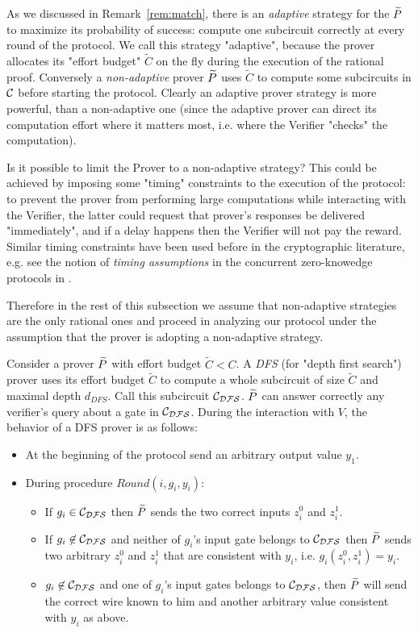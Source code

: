 As we discussed in Remark~\ref{rem:match}, there is an {\em adaptive} strategy for the $\widetilde{P}$ to maximize its probability of success: compute one subcircuit correctly at every round of the protocol. We call this strategy "adaptive", because the prover allocates its "effort budget" $\tilde{C}$ on the fly during the execution of the rational proof. Conversely a {\em non-adaptive} prover $\widetilde{P}$ uses $\tilde{C}$ to compute some subcircuits in $\cal C$ before starting the protocol. Clearly an adaptive prover strategy is more powerful, than a non-adaptive one (since the adaptive prover can direct its computation effort where it matters most, i.e. where the Verifier "checks" the computation). 

Is it possible to limit the Prover to a non-adaptive strategy? This could be achieved by imposing some "timing" constraints to the execution of the protocol: to prevent the prover from performing large computations while interacting with the Verifier, the latter could request that prover's responses be delivered "immediately", and if a delay happens then the Verifier will not pay the reward. Similar timing constraints have been used before in the cryptographic literature, e.g. see the notion of {\em timing assumptions} in the concurrent zero-knowedge protocols in \cite{dns}.

Therefore in the rest of this subsection we assume that non-adaptive strategies are the only rational ones and proceed in analyzing our protocol 
under the assumption that the prover is adopting a non-adaptive strategy. 


Consider a prover $\widetilde{P}$ with effort budget $\tilde{C} < C$. A \emph{DFS} (for "depth first search") prover  uses its effort budget $\tilde{C}$ to compute a whole subcircuit of size $\tilde{C}$ and maximal depth $d_{DFS}$. Call this subcircuit $\cal{C}_{DFS}$. $\widetilde{P}$ can answer correctly any verifier's query about a gate in $\cal{C}_{DFS}$. During the interaction with $V$, the behavior of a DFS prover is as follows:
\begin{itemize}
\item At the beginning of the protocol send an arbitrary output value $y_1$.
\item During procedure $Round(i, g_i, y_i)$:
\begin{itemize}
\item If $g_i \in \cal{C}_{DFS}$  then $\widetilde{P}$ sends the two correct inputs $z^0_i$ and $z^1_i$.
\item If $g_i \not \in \cal{C}_{DFS}$ and neither of $g_i$'s input gate belongs to $\cal{C}_{DFS}$ then $\widetilde{P}$ sends two arbitrary $z^0_i$ and $z^1_i$ that are consistent with $y_i$, i.e. $g_i(z^0_i,z^1_i) = y_i$.
\item $g_i \not \in \cal{C}_{DFS}$ and one of $g_i$'s input gates belongs to $\cal{C}_{DFS}$, then $\widetilde{P}$ will send the correct wire known to him and another arbitrary value consistent with $y_i$ as above.
\end{itemize} 
\end{itemize}

